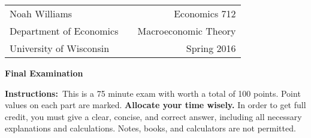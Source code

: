 \documentclass[12pt]{article}
\begin{document}
\begin{tabular}{lcr}
Noah Williams &\hspace*{150pt} & Economics 712 \\
Department of Economics && Macroeconomic Theory \\
University of Wisconsin && Spring 2016
\end{tabular}
\vspace{12pt}

\begin{center}
\textbf{\large Final Examination} \vspace{12pt}
\end{center}

\noindent \textbf{Instructions:}\ This is a 75 minute exam with
worth a total of 100 points. Point values on each part are marked.
\textbf{Allocate your time wisely.} In
order to get full credit, you must give a clear, concise, and
correct answer, including all necessary explanations and
calculations. Notes, books, and calculators are not permitted.

\bigskip
\end{document}
